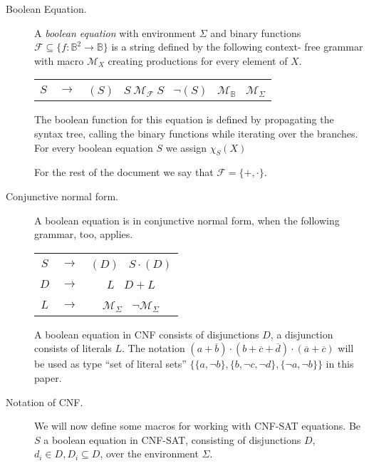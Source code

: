\documentclass[12pt, letterpaper]{article}
\begin{document}
    \begin{description}
        
        \item[Boolean Equation.] {
            A \emph{boolean equation} with environment $\Sigma$ and
            binary functions $\mathcal{F}\subseteq\{f:\mathbb{B}^2\rightarrow
            \mathbb{B}\}$ is a string defined by the following context-
            free grammar with macro $\mathcal{M}_X$ creating productions
            for every element of $X$.


            \begin{center}
                \begin{tabular}{ccc}
                    $S$ & $\rightarrow$& $(S)$ \vline\ $S\ \mathcal{M}_\mathcal{F}\ S$ \vline\ $\lnot (S)$ \vline\ $\mathcal{M}_\mathbb{B}$ \vline\ $\mathcal{M}_\Sigma$\\ 
                \end{tabular}
            \end{center}

            The boolean function for this equation is defined by propagating
            the syntax tree, calling the binary functions while iterating
            over the branches. For every boolean equation $S$ we assign
            $\chi_S(X)$ 

            For the rest of the document we say that $\mathcal{F} = \{+,
            \cdot\}$.
        }
        \item[Conjunctive normal form.] {
            A boolean equation is in conjunctive normal form, when the
            following grammar, too, applies.

            \begin{center}
                \begin{tabular}{ccc}
                    $S$ & $\rightarrow$& $(D)$ \vline\ $S \cdot (D)$ \\ 
                    $D$ & $\rightarrow$& $L$ \vline\ $D + L$ \\ 
                    $L$ & $\rightarrow$& $\mathcal{M}_\Sigma$ \vline\ $\lnot\mathcal{M}_\Sigma$
                \end{tabular}
            \end{center}

            A boolean equation in CNF consists of disjunctions $D$, a
            disjunction consists of literals $L$. The notation $(a+\overline
            b) \cdot (b +\overline c + \overline d) \cdot (\overline a +
            \overline c)$ will be used as type ``set of literal sets'' $\{\{a,
            \lnot b\}, \{b, \lnot c, \lnot d\}, \{\lnot a, \lnot b\}\}$ in
            this paper.
        }
        \item[Notation of CNF.] {
            We will now define some macros for working with CNF-SAT
            equations. Be $S$ a boolean equation in CNF-SAT, consisting
            of disjunctions $D$, $d_i \in D, D_i \subseteq D$, over the
            environment $\Sigma$.

}
\end{description}
\end{document}

